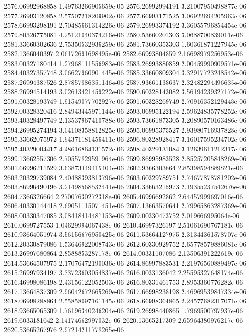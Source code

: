 {2576.06992968858 1.49763266905659e-05
2576.26992994191 3.21007950498877e-06
2577.26993120858 2.57507218209902e-06
2577.66993171525 3.06922694205963e-06
2578.66993298191 2.70485661314226e-06
2579.26993374192 3.36055796854454e-06
2579.80326775081 4.25121040374216e-06
2580.53660201303 3.0688700839011e-06
2581.33660302636 2.75350532936259e-06
2581.73660353303 1.60361871227945e-06
2582.1366040397 2.06172691698495e-06
2582.66993804859 2.16698979256953e-06
2583.00327180414 1.27968111556983e-06
2583.26993880859 2.00459990909571e-06
2584.40327357748 3.06627960901445e-06
2585.33660809304 3.32917723248542e-06
2587.26994387526 2.87857886351146e-06
2587.93661138637 2.32482294496635e-06
2588.26994514193 3.02613421459222e-06
2590.60328143082 3.56194239327172e-06
2591.00328193749 1.91549077702927e-06
2591.60328269749 2.70916352129448e-06
2592.00328320416 2.84943445971144e-06
2593.06995122194 2.59624835778252e-06
2593.40328497749 2.13537967410788e-06
2593.73661873305 3.20890570163486e-06
2594.26995274194 3.04108358812825e-06
2595.06995375527 2.93980716937828e-06
2595.33662075972 1.94371181456411e-06
2596.80328928417 3.16017595234702e-06
2597.40329004417 4.48616864131572e-06
2598.40329131084 3.12639611212317e-06
2599.13662557306 2.70557829591964e-06
2599.86995983528 2.85257205848269e-06
2601.66996211529 3.63873449415404e-06
2602.9366303864 2.85398594889821e-06
2603.20329739084 2.40488393813796e-06
2603.60329789751 2.74677878781202e-06
2603.86996490196 3.21498568532441e-06
2604.33663215973 2.19355237542676e-06
2604.7366326664 2.27007630272318e-06
2605.46996692862 2.64457999697016e-06
2606.40330144418 2.69051115071451e-06
2607.13663570641 2.79965863287369e-06
2608.00330347085 3.08418414487153e-06
2609.00330473752 2.019666995064e-06
2610.0699727553 1.04629994067438e-06
2610.46997326197 2.51061690767181e-06
2610.93664051974 3.56156676950425e-06
2611.53664127975 2.31344361578707e-06
2612.20330879086 1.53646922008743e-06
2612.60330929752 2.65778579886081e-06
2613.26997680864 2.8588853287178e-06
2614.00331107086 2.13506391222619e-06
2614.53664507975 2.17076472190036e-06
2614.86997883531 2.21976560889497e-06
2615.26997934197 3.33723603054837e-06
2616.0033136042 2.25595327648174e-06
2616.46998086198 2.43156122052503e-06
2616.80331461753 2.8953360776282e-06
2617.13664837309 2.96042672665269e-06
2617.66998238198 2.46969539847334e-06
2618.06998288864 2.55858097161145e-06
2618.66998364865 2.24577682317071e-06
2618.93665065309 1.76196340246204e-06
2619.26998440865 1.7969500797937e-06
2619.6033181642 2.14174662997032e-06
2620.13665217309 2.65964380976217e-06
2620.53665267976 2.97214211778265e-06
}

